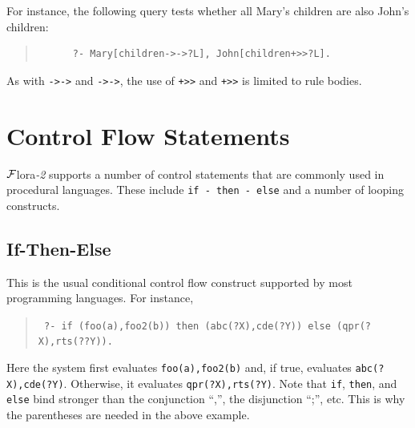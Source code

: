 \documentclass[11pt]{article}
\newcommand{\FLORA}{{\mbox{\sc ${\cal F}${lora}\rm\emph{-2}}}\xspace}
\begin{document}
For instance, the following query tests whether all Mary's children are
also John's children:
\begin{quote}
\begin{verbatim}
      ?- Mary[children->->?L], John[children+>>?L].
\end{verbatim}
\end{quote}

As with {\tt ->->} and {\tt *->->},
the use of {\tt +>>} and {\tt *+>>} is limited to rule bodies.


\section{Control Flow Statements}\label{sec:control}

\FLORA supports a number of control statements that are commonly used in
procedural languages. These include {\tt if - then - else} and 
a number of looping constructs.

\subsection{If-Then-Else}
This is the usual conditional control flow
construct supported by most programming languages.  For instance,
\begin{quote}
 \tt
       ?- if (foo(a),foo2(b)) then (abc(?X),cde(?Y)) else (qpr(?X),rts(??Y)).
\end{quote}
Here the system first evaluates {\tt foo(a),foo2(b)} and, if true,
evaluates {\tt abc(?X),cde(?Y)}. Otherwise, it evaluates {\tt qpr(?X),rts(?Y)}.
Note that {\tt if}, {\tt then}, and {\tt else}
bind stronger than the conjunction ``,'', the
disjunction ``;'', etc. This is why the parentheses are needed in the above
example.
\end{document}
